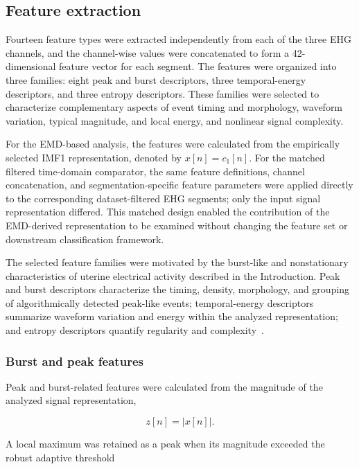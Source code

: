 \documentclass[10pt,letterpaper]{article}
\begin{document}
\subsection*{Feature extraction}

Fourteen feature types were extracted independently from each of the three EHG channels, and the channel-wise values were concatenated to form a 42-dimensional feature vector for each segment. The features were organized into three families: eight peak and burst descriptors, three temporal-energy descriptors, and three entropy descriptors. These families were selected to characterize complementary aspects of event timing and morphology, waveform variation, typical magnitude, and local energy, and nonlinear signal complexity.

For the EMD-based analysis, the features were calculated from the empirically selected IMF1 representation, denoted by $x[n]=c_1[n]$. For the matched filtered time-domain comparator, the same feature definitions, channel concatenation, and segmentation-specific feature parameters were applied directly to the corresponding dataset-filtered EHG segments; only the input signal representation differed. This matched design enabled the contribution of the EMD-derived representation to be examined without changing the feature set or downstream classification framework.

The selected feature families were motivated by the burst-like and nonstationary characteristics of uterine electrical activity described in the Introduction. Peak and burst descriptors characterize the timing, density, morphology, and grouping of algorithmically detected peak-like events; temporal-energy descriptors summarize waveform variation and energy within the analyzed representation; and entropy descriptors quantify regularity and complexity~\cite{GarfieldManer2007, garfield1998control,Lammers2013}.

\subsubsection*{Burst and peak features}

Peak and burst-related features were calculated from the magnitude of the analyzed signal representation,

\begin{equation}
z[n] = |x[n]|.
\end{equation}

A local maximum was retained as a peak when its magnitude exceeded the robust adaptive threshold
\end{document}
